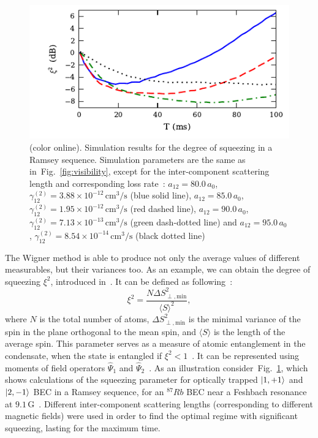 \documentclass[aps,prl,twocolumn,showpacs,amsmath,amssymb,superscriptaddress]{revtex4-1}
\newcommand{\figref}[1]{Fig.~\ref{#1}}
\newcommand{\ket}[1]{\mbox{\ensuremath{| #1 \rangle}}}
\begin{document}
\begin{figure}
	\includegraphics{figures_generated/ramsey_squeezing.pdf}

	\caption{(color online).
	Simulation results for the degree of squeezing in a Ramsey sequence.
	Simulation parameters are the same as in~\figref{fig:visibility},
	except for the inter-component scattering length and corresponding loss rate~\cite{Kaufman2009}:
	$a_{12} = 80.0\,a_0$, $\gamma^{(2)}_{12} = 3.88 \times 10^{-12}\,\mathrm{cm^3/s}$ (blue solid line),
	$a_{12} = 85.0\,a_0$, $\gamma^{(2)}_{12} = 1.95 \times 10^{-12}\,\mathrm{cm^3/s}$ (red dashed line),
	$a_{12} = 90.0\,a_0$, $\gamma^{(2)}_{12} = 7.13 \times 10^{-13}\,\mathrm{cm^3/s}$ (green dash-dotted line) and
	$a_{12} = 95.0\,a_0$, $\gamma^{(2)}_{12} = 8.54 \times 10^{-14}\,\mathrm{cm^3/s}$ (black dotted line)}

	\label{fig:squeezing}
\end{figure}

The Wigner method is able to produce not only the average values of different measurables,
but their variances too.
As an example, we can obtain the degree of squeezing $\xi^2$, introduced in~\cite{Wineland1994,Sorensen2001}.
It can be defined as following~\cite{Li2009}:
\begin{equation}
\label{eqn:squeezing}
	\xi^2 = \frac{N \Delta S^2_{\perp, \mathrm{min}}}{\langle S \rangle^2},
\end{equation}
where $N$ is the total number of atoms,
$\Delta S^2_{\perp, \mathrm{min}}$ is the minimal variance of the spin in the plane orthogonal to the mean spin,
and $\langle S \rangle$ is the length of the average spin.
This parameter serves as a measure of atomic entanglement in the condensate,
when the state is entangled if $\xi^2 < 1$~\cite{Sorensen2001}.
It can be represented using moments of field operators $\widehat{\Psi}_1$
and $\widehat{\Psi}_2$~\cite{Li2009}.
As an illustration consider~\figref{fig:squeezing}, which shows calculations of the squeezing parameter
for optically trapped $\ket{1,+1}$ and $\ket{2,-1}$ BEC in a Ramsey sequence, for an $^{87}Rb$ BEC near a Feshbach resonance at $9.1\,\mathrm{G}$~\cite{Kaufman2009}.
Different inter-component scattering lengths (corresponding to different magnetic fields) were used in order to find the optimal regime
with significant squeezing, lasting for the maximum time.
\end{document}
